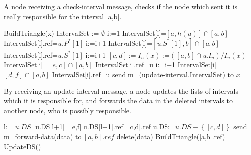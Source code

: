 \documentclass[11pt]{article}
\begin{document}
\begin{algorithm}
A node receiving a check-interval message, checks if the node which sent it is really responsible for the interval [a,b].

\begin{algorithmic}
\State BuildTriangle(x)
\EndIf
\State IntervalSet := $\emptyset$
\State i:=1
\State IntervalSet[i]=$[a,h(u)] \cap [a,b]$ 
\State IntervalSet[i].ref=$u.P^*[1]$
\State i:=i+1
\EndIf
{}
\State IntervalSet[i]=$[u.S^*[1],b]\cap [a,b]$ 
\State IntervalSet[i].ref=$u.S^*[1]$
\State i:=i+1
\EndIf
\State $[c,d]:=I_u(x)$          
\State [e,f]:=$([a,b]\cap u.I_u)/I_u(x)$
\State IntervalSet[i]=$[e,c]\cap [a,b]$ 
\State IntervalSet[i].ref=u
\State i:=i+1
\EndIf
{}
\State IntervalSet[i]=$[d,f]\cap [a,b]$ 
\State IntervalSet[i].ref=u
\EndIf
\State send m=(update-interval,IntervalSet) to $x$
\EndFunction
\end{algorithmic}
\end{algorithm}


\begin{algorithm}
By receiving an update-interval message, a node updates the lists of intervals which it is responsible for, and forwards the data in the
deleted intervals to another node, who is possibly responsible.

\begin{algorithmic}
\ForAll {$[e,f]\in\left\{[c,d]-[a,b]\right\}$}
\State l:=$|u.DS|$
\State u.DS[l+1]=[e,f]
\State u.DS[l+1].ref=[c,d].ref 
\State u.DS:=$u.DS-\left\{[c,d]\right\}$
\EndFor
{}
\State send m=forward-data(data) to  $[a,b].ref$ 
\State delete(data)
\State BuildTriangle([a,b].ref) 
\EndFor
\EndFor
\EndFor
\State UpdateDS() 
\EndFunction
\end{algorithmic}
\end{algorithm}
\end{document}

